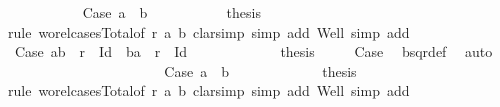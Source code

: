 \begin{isabellebody}
\ \ \ \ \ \ \ \ \ \isamarkupfalse%
\ Case{}{}{}{\isacharcolon}{\kern0pt}\ {\isachardoublequoteopen}a{}\ {\isacharequal}{\kern0pt}\ b{}{\isachardoublequoteclose}\isanewline
\ \ \ \ \ \ \ \ \ \isamarkupfalse%
\ {\isacharquery}{\kern0pt}thesis\isanewline
\ \ \ \ \ \ \ \ \ \isamarkupfalse%
{\isacharparenleft}{\kern0pt}rule\ wo{\isacharunderscore}{\kern0pt}rel{\isachardot}{\kern0pt}cases{\isacharunderscore}{\kern0pt}Total{}{\isacharbrackleft}{\kern0pt}of\ r\ a{}\ b{}{\isacharbrackright}{\kern0pt}{\isacharcomma}{\kern0pt}\ clarsimp\ simp\ add{\isacharcolon}{\kern0pt}\ Well{\isacharcomma}{\kern0pt}\ simp\ add{\isacharcolon}{\kern0pt}\ {}{\isacharparenright}{\kern0pt}\isanewline
\ \ \ \ \ \ \ \ \ \ \ \isamarkupfalse%
\ Case{}{}{}{}{\isacharcolon}{\kern0pt}\ {\isachardoublequoteopen}{\isacharparenleft}{\kern0pt}a{}{\isacharcomma}{\kern0pt}b{}{\isacharparenright}{\kern0pt}\ {\isasymin}\ r\ {\isacharminus}{\kern0pt}\ Id\ {\isasymor}\ {\isacharparenleft}{\kern0pt}b{}{\isacharcomma}{\kern0pt}a{}{\isacharparenright}{\kern0pt}\ {\isasymin}\ r\ {\isacharminus}{\kern0pt}\ Id{\isachardoublequoteclose}\isanewline
\ \ \ \ \ \ \ \ \ \ \ \isamarkupfalse%
\ {\isacharquery}{\kern0pt}thesis\ \isamarkupfalse%
\ {}\ {}\ {}\ Case{}{}{}\ \isamarkupfalse%
\ bsqr{\isacharunderscore}{\kern0pt}def\ \isamarkupfalse%
\ auto\isanewline
\ \ \ \ \ \ \ \ \ \isamarkupfalse%
\isanewline
\ \ \ \ \ \ \ \ \ \ \ \isamarkupfalse%
\ Case{}{}{}{}{\isacharcolon}{\kern0pt}\ {\isachardoublequoteopen}a{}\ {\isacharequal}{\kern0pt}\ b{}{\isachardoublequoteclose}\isanewline
\ \ \ \ \ \ \ \ \ \ \ \isamarkupfalse%
\ {\isacharquery}{\kern0pt}thesis\isanewline
\ \ \ \ \ \ \ \ \ \ \ \isamarkupfalse%
{\isacharparenleft}{\kern0pt}rule\ wo{\isacharunderscore}{\kern0pt}rel{\isachardot}{\kern0pt}cases{\isacharunderscore}{\kern0pt}Total{}{\isacharbrackleft}{\kern0pt}of\ r\ a{}\ b{}{\isacharbrackright}{\kern0pt}{\isacharcomma}{\kern0pt}\ clarsimp\ simp\ add{\isacharcolon}{\kern0pt}\ Well{\isacharcomma}{\kern0pt}\ simp\ add{\isacharcolon}{\kern0pt}\ {}{\isacharparenright}{\kern0pt}\isanewline

\end{isabellebody}
